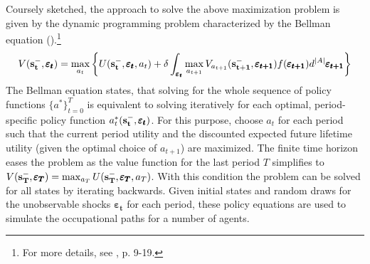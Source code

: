 Coursely sketched, the approach to solve the above maximization problem is given by the dynamic programming problem characterized by the Bellman equation (\cite{Bellman.1957}).\footnote{For more details, see \cite{Raabe.2019}, p. 9-19.}
\begin{align} \label{eq:Bellman}
V(\bold{s_t^-}, \pmb{\varepsilon_t}) = \max_{a_t} \bigg\{ U(\bold{s_t^-}, \pmb{\varepsilon_t}, a_t) + \delta \int_{\pmb{\varepsilon_t}} \max_{a_{t+1}} V_{a_{t+1}}(\bold{s_{t+1}^{-}},\pmb{\varepsilon_{t+1}}) f(\pmb{\varepsilon_{t+1}})d^{|A|}\pmb{\varepsilon_{t+1}}\bigg\}
\end{align}
\noindent
The Bellman equation states, that solving for the whole sequence of policy functions ${\{a^*\}_{t=0}^T}$ is equivalent to solving iteratively for each optimal, period-specific policy function $a_t^*(\bold{s_t^-}, \pmb{\varepsilon_t})$. For this purpose, choose $a_t$ for each period such that the current period utility and the discounted expected future lifetime utility (given the optimal choice of $a_{t+1}$) are maximized. The finite time horizon eases the problem as the value function for the last period $T$ simplifies to $V(\bold{s_T^-}, \pmb{\varepsilon_T}) = \max_{a_T} U(\bold{s_T^-}, \pmb{\varepsilon_T}, a_T)$. With this condition the problem can be solved for all states by iterating backwards. Given initial states and random draws for the  unobservable shocks $\pmb{\varepsilon_t}$ for each period, these policy equations are used to simulate the occupational paths for a number of agents.\\

